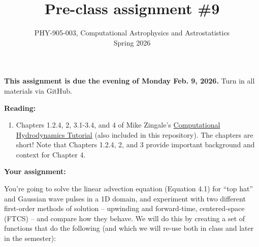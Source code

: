 \documentclass[10pt]{article}
\title{Pre-class assignment \#9}
\author{PHY-905-003, Computational Astrophysics and
  Astrostatistics\\Spring 2026}
\date{} %
\begin{document}
 
\maketitle

\vspace{-5mm}

\noindent
\textbf{This assignment is due the evening of Monday Feb. 9, 2026.}
 Turn in all materials via GitHub.

\vspace{5mm}

\noindent
\textbf{Reading:}

\begin{enumerate}

\item Chapters 1.2.4, 2, 3.1-3.4, and 4 of Mike Zingale's
  \href{https://open-astrophysics-bookshelf.github.io/numerical_exercises/CompHydroTutorial.pdf}{Computational
  Hydrodynamics Tutorial} (also included in this repository).  The
chapters are short!  Note that Chapters 1.2.4, 2, and 3 provide
important background and context for Chapter 4.

\end{enumerate}

\noindent
\textbf{Your assignment:}  

\vspace{5mm}

You're going to solve the linear advection equation (Equation 4.1) for
``top hat'' and Gaussian wave pulses in a 1D domain, and experiment with two
different first-order methods of solution -- upwinding and
forward-time, centered-space (FTCS) -- and compare how they behave.
We will do this by creating a set of functions that do the following
(and which we will re-use both in class and later in the semester):
\end{document}
